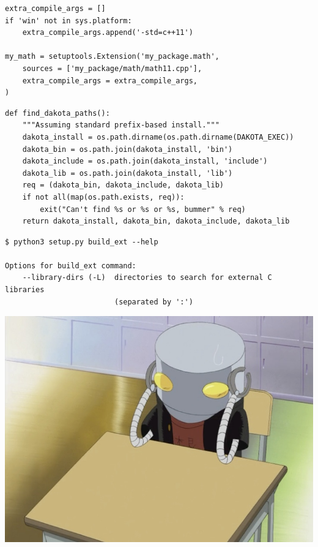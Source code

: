 \documentclass[pdf]{beamer}
\begin{document}
\begin{frame}[fragile]
    \begin{verbatim}
extra_compile_args = []
if 'win' not in sys.platform:
    extra_compile_args.append('-std=c++11')

my_math = setuptools.Extension('my_package.math',
    sources = ['my_package/math/math11.cpp'],
    extra_compile_args = extra_compile_args,
)
    \end{verbatim}
\end{frame}

\begin{frame}
    \begin{verbatim}
def find_dakota_paths():
    """Assuming standard prefix-based install."""
    dakota_install = os.path.dirname(os.path.dirname(DAKOTA_EXEC))
    dakota_bin = os.path.join(dakota_install, 'bin')
    dakota_include = os.path.join(dakota_install, 'include')
    dakota_lib = os.path.join(dakota_install, 'lib')
    req = (dakota_bin, dakota_include, dakota_lib)
    if not all(map(os.path.exists, req)):
        exit("Can't find %s or %s or %s, bummer" % req)
    return dakota_install, dakota_bin, dakota_include, dakota_lib

    \end{verbatim}
\end{frame}

\begin{frame}[fragile]
    \begin{verbatim}
$ python3 setup.py build_ext --help

Options for build_ext command:
    --library-dirs (-L)  directories to search for external C libraries
                         (separated by ':')
    \end{verbatim}
\end{frame}

\begin{frame}
    \begin{center}
        \includegraphics[height = 0.8\textheight]{mechazawa-sad.jpg}
    \end{center}
\end{frame}
\end{document}
